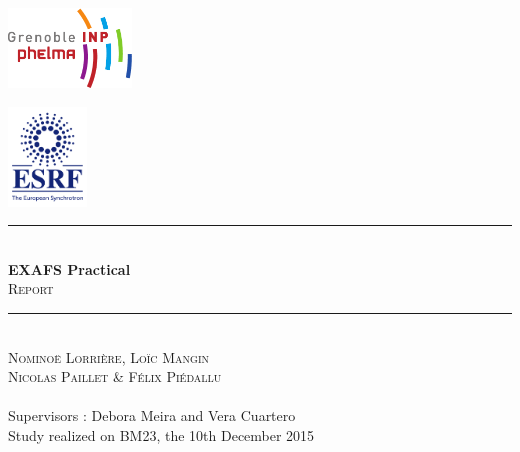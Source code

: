 \begin{titlepage}
    \vspace*{-10px}
    \includegraphics[height=80px]{Images/logo_phelma.pdf}
    \vspace*{-80px}
\begin{flushright}
    \vspace*{-30px}
    \includegraphics[height=100px]{Images/ESRF_logo}
\end{flushright}

\vspace*{0.5cm}
\begin{center}
\rule{\linewidth}{0.5mm}
    \\[0.4cm]
    {\huge \textbf{EXAFS Practical}}
    \\[0.4cm]
    {\huge \textsc{Report}}
    \\[0.4cm]
\rule{\linewidth}{0.5mm}
\\[1cm]

    \LARGE{\textsc{Nominoë Lorrière, Loïc Mangin\\ Nicolas Paillet \& Félix Piédallu}}
    \\[0.7cm]
    \large{~}%
    \\[1cm]

    \Large{Supervisors : Debora Meira and Vera Cuartero}\\[1cm]

    \large{Study realized on BM23, the 10th December 2015}\\[2cm]


\end{center}
\end{titlepage}

\tableofcontents        %
\newpage
{}  %
